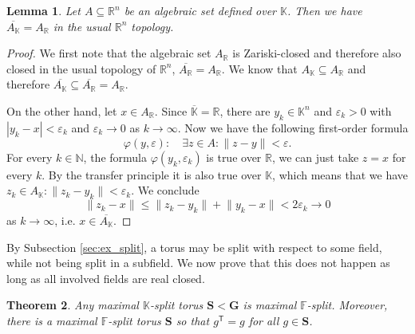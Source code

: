 \documentclass[12pt]{amsart}
\newcommand{\F}{\mathbb{F} }
\newcommand{\R}{\mathbb{R} }
\newcommand{\N}{\mathbb{N} }
\newcommand{\K}{\mathbb{K}}
\newcommand{\bG}{\mathbf{G}}
\newcommand{\bS}{\mathbf{S}}
\newcommand{\tran}{{^{\mathsf{T}}\!}}
\numberwithin{equation}{section}
\newtheorem{theorem}{Theorem}[section]
\newtheorem{lemma}[theorem]{Lemma}
\theoremstyle{remark} %
\begin{document}
\begin{lemma}\label{lem:closure_alg}
	Let $A\subseteq \R^n$ be an algebraic set defined over $\K$. Then we have $\overline{A_\K} = A_\R$ in the usual $\R^n$ topology.
\end{lemma}
\begin{proof}
	We first note that the algebraic set $A_\R$ is Zariski-closed and therefore also closed in the usual topology of $\R^n$, $\overline{A_\R} = A_\R$. We know that $A_\K \subseteq A_\R$ and therefore $\overline{A_\K} \subseteq \overline{A_\R} = A_\R$.
	
	On the other hand, let $x \in A_\R$. Since $\overline{\K} = \R$, there are $y_k \in \K^n$ and $\varepsilon_k >0$ with $|y_k - x|< \varepsilon_k$ and $\varepsilon_k \to 0$ as $k \to \infty$. Now we have the following first-order formula
	$$
	\varphi(y, \varepsilon ) \colon \quad \exists z\in A \colon \lVert z-y \rVert < \varepsilon.
	$$
	For every $k\in \N$, the formula $\varphi(y_k,\varepsilon_k)$ is true over $\R$, we can just take $z=x$ for every $k$. By the transfer principle it is also true over $\K$, which means that we have
	$
	z_k \in A_\K \colon \lVert z_k -y_k \rVert < \varepsilon_k.
	$
	We conclude
	$$
	\lVert z_k - x \rVert \leq \lVert z_k - y_k\rVert + \lVert y_k - x\rVert < 2 \varepsilon_k \to 0
	$$
	as $k \to \infty$, i.e. $x \in \overline{A_\K}$.
\end{proof}




By Subsection \ref{sec:ex_split}, a torus may be split with respect to some field, while not being split in a subfield. We now prove that this does not happen as long as all involved fields are real closed.

\begin{theorem}\label{thm:split_tori}
	Any maximal $\K$-split torus $\bS < \bG$ is maximal $\F$-split. Moreover, there is a maximal $\F$-split torus $\bS$ so that $g\tran = g$ for all $g \in \bS$.
\end{theorem}
\end{document}
